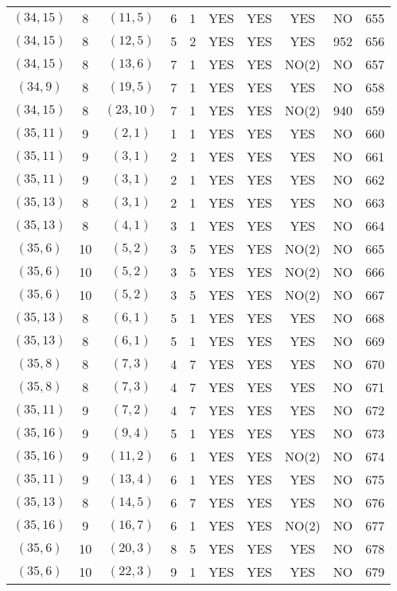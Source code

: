 \begin{longtable}{|c|c|c|c|c|c|c|c|c|c|}
$(34, 15)$ & 8 & $(11, 5)$ & 6 & 1 & YES & YES & YES & NO & 655\\
$(34, 15)$ & 8 & $(12, 5)$ & 5 & 2 & YES & YES & YES & 952 & 656\\
$(34, 15)$ & 8 & $(13, 6)$ & 7 & 1 & YES & YES & NO(2) & NO & 657\\
$(34, 9)$ & 8 & $(19, 5)$ & 7 & 1 & YES & YES & YES & NO & 658\\
$(34, 15)$ & 8 & $(23, 10)$ & 7 & 1 & YES & YES & NO(2) & 940 & 659\\
$(35, 11)$ & 9 & $(2, 1)$ & 1 & 1 & YES & YES & YES & NO & 660\\
$(35, 11)$ & 9 & $(3, 1)$ & 2 & 1 & YES & YES & YES & NO & 661\\
$(35, 11)$ & 9 & $(3, 1)$ & 2 & 1 & YES & YES & YES & NO & 662\\
$(35, 13)$ & 8 & $(3, 1)$ & 2 & 1 & YES & YES & YES & NO & 663\\
$(35, 13)$ & 8 & $(4, 1)$ & 3 & 1 & YES & YES & YES & NO & 664\\
$(35, 6)$ & 10 & $(5, 2)$ & 3 & 5 & YES & YES & NO(2) & NO & 665\\
$(35, 6)$ & 10 & $(5, 2)$ & 3 & 5 & YES & YES & NO(2) & NO & 666\\
$(35, 6)$ & 10 & $(5, 2)$ & 3 & 5 & YES & YES & NO(2) & NO & 667\\
$(35, 13)$ & 8 & $(6, 1)$ & 5 & 1 & YES & YES & YES & NO & 668\\
$(35, 13)$ & 8 & $(6, 1)$ & 5 & 1 & YES & YES & YES & NO & 669\\
$(35, 8)$ & 8 & $(7, 3)$ & 4 & 7 & YES & YES & YES & NO & 670\\
$(35, 8)$ & 8 & $(7, 3)$ & 4 & 7 & YES & YES & YES & NO & 671\\
$(35, 11)$ & 9 & $(7, 2)$ & 4 & 7 & YES & YES & YES & NO & 672\\
$(35, 16)$ & 9 & $(9, 4)$ & 5 & 1 & YES & YES & YES & NO & 673\\
$(35, 16)$ & 9 & $(11, 2)$ & 6 & 1 & YES & YES & NO(2) & NO & 674\\
$(35, 11)$ & 9 & $(13, 4)$ & 6 & 1 & YES & YES & YES & NO & 675\\
$(35, 13)$ & 8 & $(14, 5)$ & 6 & 7 & YES & YES & YES & NO & 676\\
$(35, 16)$ & 9 & $(16, 7)$ & 6 & 1 & YES & YES & NO(2) & NO & 677\\
$(35, 6)$ & 10 & $(20, 3)$ & 8 & 5 & YES & YES & YES & NO & 678\\
$(35, 6)$ & 10 & $(22, 3)$ & 9 & 1 & YES & YES & YES & NO & 679\\

\end{longtable}
